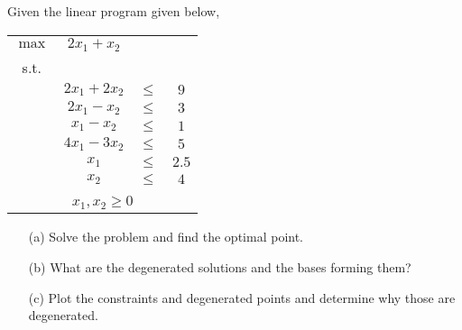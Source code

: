 
Given the linear program given below,

\begin{center}
	\begin{enumerate}
		\begin{tabular}{*4c}
			$\max$ & $2x_1 + x_2$ & \\
			s.t. \\
			& $2x_1 + 2x_2$ & $\leq$ & $9$  \\
			& $2x_1 -  x_2$ & $\leq$ & $3$   \\
			& $ x_1 -  x_2$ & $\leq$ & $1$   \\
			& $4x_1 - 3x_2$ & $\leq$ & $5$   \\
			& $x_1$         & $\leq$ & $2.5$ \\
			& $x_2$         & $\leq$ & $4$   \\
			\\
			\multicolumn{4}{c}{$x_1, x_2 \geq 0$}\\
		\end{tabular}
	\end{enumerate}
\end{center}

\begin{itemize}
\item[(a)] Solve the problem and find the optimal point.
\item[(b)] What are the degenerated solutions and the bases forming them?
\item[(c)] Plot the constraints and degenerated points and determine why those are degenerated.
\end{itemize}